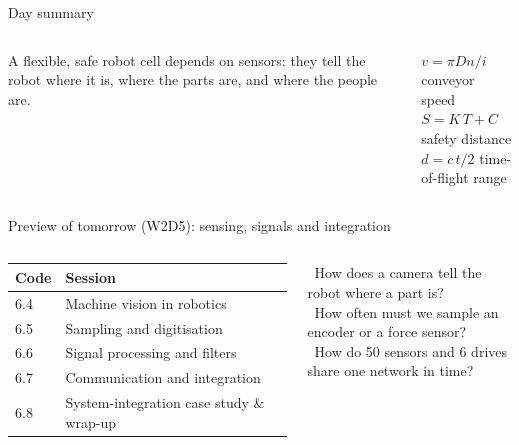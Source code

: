 \documentclass[aspectratio=169,10pt]{beamer}
\begin{document}
\begin{frame}{Day summary}
\begin{columns}[T]
\centering
{}
\begin{keybox}
\small A flexible, safe robot cell depends on sensors: they tell the robot where it is, where the parts are, and where the people are.
\end{keybox}
\begin{defbox}
\small
$v=\pi D n/i$ \quad conveyor speed\\[1mm]
$S=K\,T+C$ \quad safety distance\\[1mm]
$d=c\,t/2$ \quad time-of-flight range
\end{defbox}
\end{columns}
\end{frame}

\begin{frame}{Preview of tomorrow (W2D5): sensing, signals and integration}
\begin{columns}[T]
\small
\renewcommand{\arraystretch}{1.15}
\begin{tabularx}{\linewidth}{@{}l X@{}}
\toprule
\textbf{Code} & \textbf{Session}\\
\midrule
6.4 & Machine vision in robotics\\
6.5 & Sampling and digitisation\\
6.6 & Signal processing and filters\\
6.7 & Communication and integration\\
6.8 & System-integration case study \& wrap-up\\
\bottomrule
\end{tabularx}
\begin{defbox}
\small
\checkitem\ How does a camera tell the robot where a part is?\\[1mm]
\checkitem\ How often must we sample an encoder or a force sensor?\\[1mm]
\checkitem\ How do 50 sensors and 6 drives share one network in time?
\end{defbox}
\end{columns}
\end{frame}
\end{document}
